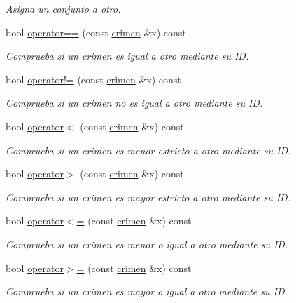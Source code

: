 \begin{DoxyCompactItemize}
\begin{DoxyCompactList}\small\item\em Asigna un conjunto a otro. \end{DoxyCompactList}\item 
bool \hyperlink{classcrimen_aeced9ce4b7486123412975b8884d1ab7}{operator==} (const \hyperlink{classcrimen}{crimen} \&x) const 
\begin{DoxyCompactList}\small\item\em Comprueba si un crimen es igual a otro mediante su I\-D. \end{DoxyCompactList}\item 
bool \hyperlink{classcrimen_ae1e53ba43d1778dd0195724e174d842b}{operator!=} (const \hyperlink{classcrimen}{crimen} \&x) const 
\begin{DoxyCompactList}\small\item\em Comprueba si un crimen no es igual a otro mediante su I\-D. \end{DoxyCompactList}\item 
bool \hyperlink{classcrimen_ac865fdb9712f2426d947b1b5546b50e5}{operator$<$} (const \hyperlink{classcrimen}{crimen} \&x) const 
\begin{DoxyCompactList}\small\item\em Comprueba si un crimen es menor estricto a otro mediante su I\-D. \end{DoxyCompactList}\item 
bool \hyperlink{classcrimen_ad0e1ff280d7899e9c7191b4bfc799e9d}{operator$>$} (const \hyperlink{classcrimen}{crimen} \&x) const 
\begin{DoxyCompactList}\small\item\em Comprueba si un crimen es mayor estricto a otro mediante su I\-D. \end{DoxyCompactList}\item 
bool \hyperlink{classcrimen_a90e290f1e6b20a177e405638a9cfe6b5}{operator$<$=} (const \hyperlink{classcrimen}{crimen} \&x) const 
\begin{DoxyCompactList}\small\item\em Comprueba si un crimen es menor o igual a otro mediante su I\-D. \end{DoxyCompactList}\item 
bool \hyperlink{classcrimen_ab03dccbe20f893bc466facb72b1ce77a}{operator$>$=} (const \hyperlink{classcrimen}{crimen} \&x) const 
\begin{DoxyCompactList}\small\item\em Comprueba si un crimen es mayor o igual a otro mediante su I\-D. \end{DoxyCompactList}\end{DoxyCompactItemize}

